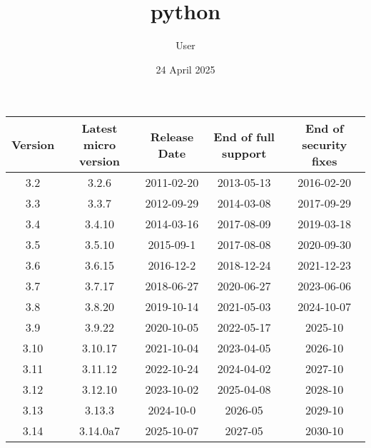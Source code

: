 \documentclass{article}
\title{python}
\author{ User }
\date{ 24 April 2025 }
\begin{document}
\begin{table}
    \centering
    \begin{tabular}{|c|c|c|c|c|}
        \hline 
        Version & Latest micro version & Release Date & End of full support & End of security fixes \\
        \hline 
        3.2 & 3.2.6 & 2011-02-20 & 2013-05-13 & 2016-02-20 \\
        \hline 
        3.3 & 3.3.7 & 2012-09-29 & 2014-03-08 & 2017-09-29 \\
        \hline 
        3.4 & 3.4.10 & 2014-03-16 & 2017-08-09 & 2019-03-18 \\
        \hline 
        3.5 & 3.5.10 & 2015-09-1 & 2017-08-08 & 2020-09-30 \\
        \hline 
        3.6 & 3.6.15 & 2016-12-2 & 2018-12-24 & 2021-12-23 \\
        \hline 
        3.7 & 3.7.17 & 2018-06-27 & 2020-06-27 & 2023-06-06 \\
        \hline 
        3.8 & 3.8.20 & 2019-10-14 & 2021-05-03 & 2024-10-07 \\
        \hline 
        3.9 & 3.9.22 & 2020-10-05 & 2022-05-17 & 2025-10 \\
        \hline 
        3.10 & 3.10.17 & 2021-10-04 & 2023-04-05 & 2026-10 \\
        \hline 
        3.11 & 3.11.12 & 2022-10-24 & 2024-04-02 & 2027-10 \\
        \hline 
        3.12 & 3.12.10 & 2023-10-02 & 2025-04-08 & 2028-10 \\
        \hline 
        3.13 & 3.13.3 & 2024-10-0 & 2026-05 & 2029-10 \\
        \hline 
        3.14 & 3.14.0a7 & 2025-10-07 & 2027-05 & 2030-10 \\
         \hline
    \end{tabular}
\end{table}
\end{document}

